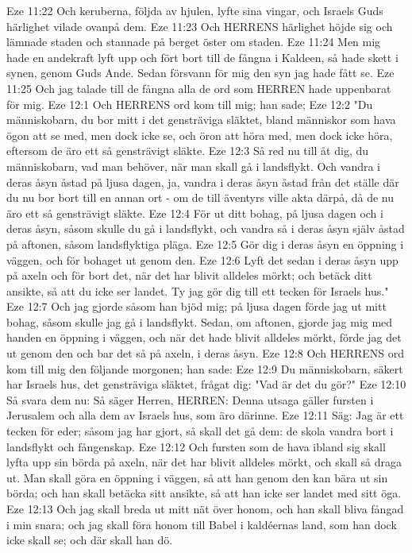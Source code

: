 Eze 11:22  Och keruberna, följda av hjulen, lyfte sina vingar, och Israels Guds härlighet vilade ovanpå dem.
Eze 11:23  Och HERRENS härlighet höjde sig och lämnade staden och stannade på berget öster om staden.
Eze 11:24  Men mig hade en andekraft lyft upp och fört bort till de fångna i Kaldeen, så hade skett i synen, genom Guds Ande. Sedan försvann för mig den syn jag hade fått se.
Eze 11:25  Och jag talade till de fångna alla de ord som HERREN hade uppenbarat för mig.
Eze 12:1  Och HERRENS ord kom till mig; han sade;
Eze 12:2  "Du människobarn, du bor mitt i det gensträviga släktet, bland människor som hava ögon att se med, men dock icke se, och öron att höra med, men dock icke höra, eftersom de äro ett så gensträvigt släkte.
Eze 12:3  Så red nu till åt dig, du människobarn, vad man behöver, när man skall gå i landsflykt. Och vandra i deras åsyn åstad på ljusa dagen, ja, vandra i deras åsyn åstad från det ställe där du nu bor bort till en annan ort - om de till äventyrs ville akta därpå, då de nu äro ett så gensträvigt släkte.
Eze 12:4  För ut ditt bohag, på ljusa dagen och i deras åsyn, såsom skulle du gå i landsflykt, och vandra så i deras åsyn själv åstad på aftonen, såsom landsflyktiga pläga.
Eze 12:5  Gör dig i deras åsyn en öppning i väggen, och för bohaget ut genom den.
Eze 12:6  Lyft det sedan i deras åsyn upp på axeln och för bort det, när det har blivit alldeles mörkt; och betäck ditt ansikte, så att du icke ser landet. Ty jag gör dig till ett tecken för Israels hus."
Eze 12:7  Och jag gjorde såsom han bjöd mig; på ljusa dagen förde jag ut mitt bohag, såsom skulle jag gå i landsflykt. Sedan, om aftonen, gjorde jag mig med handen en öppning i väggen, och när det hade blivit alldeles mörkt, förde jag det ut genom den och bar det så på axeln, i deras åsyn.
Eze 12:8  Och HERRENS ord kom till mig den följande morgonen; han sade:
Eze 12:9  Du människobarn, säkert har Israels hus, det gensträviga släktet, frågat dig: "Vad är det du gör?"
Eze 12:10  Så svara dem nu: Så säger Herren, HERREN: Denna utsaga gäller fursten i Jerusalem och alla dem av Israels hus, som äro därinne.
Eze 12:11  Säg: Jag är ett tecken för eder; såsom jag har gjort, så skall det gå dem: de skola vandra bort i landsflykt och fångenskap.
Eze 12:12  Och fursten som de hava ibland sig skall lyfta upp sin börda på axeln, när det har blivit alldeles mörkt, och skall så draga ut. Man skall göra en öppning i väggen, så att han genom den kan bära ut sin börda; och han skall betäcka sitt ansikte, så att han icke ser landet med sitt öga.
Eze 12:13  Och jag skall breda ut mitt nät över honom, och han skall bliva fångad i min snara; och jag skall föra honom till Babel i kaldéernas land, som han dock icke skall se; och där skall han dö.
